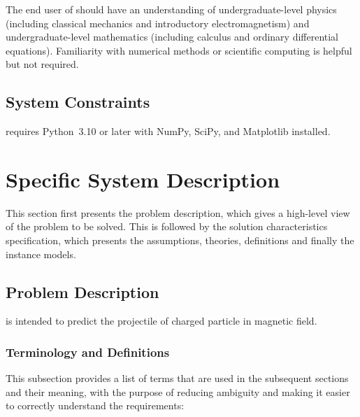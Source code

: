 \documentclass[12pt]{article}
\begin{document}
The end user of \progname{} should have an understanding of undergraduate-level physics
(including classical mechanics and introductory electromagnetism) and undergraduate-level
mathematics (including calculus and ordinary differential equations). Familiarity with
numerical methods or scientific computing is helpful but not required.

\subsection{System Constraints} \label{SecSysConstraints}

\progname{} requires Python~3.10 or later with NumPy, SciPy, and Matplotlib installed.


\section{Specific System Description}

This section first presents the problem description, which gives a high-level
view of the problem to be solved.  This is followed by the solution characteristics
specification, which presents the assumptions, theories, definitions and finally
the instance models.

\subsection{Problem Description} \label{Sec_pd}

\progname{} is intended to predict the projectile of charged particle in magnetic field.

\subsubsection{Terminology and  Definitions}

This subsection provides a list of terms that are used in the subsequent
sections and their meaning, with the purpose of reducing ambiguity and making it
easier to correctly understand the requirements:
\end{document}
